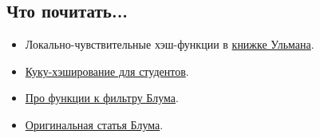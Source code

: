 \subsection{Что почитать...}

\begin{itemize}

\item Локально-чувствительные хэш-функции в \href{http://infolab.stanford.edu/~ullman/mmds/book.pdf}{книжке Ульмана}.
\item \href{http://www.it-c.dk/people/pagh/papers/cuckoo-undergrad.pdf}{Куку-хэширование для студентов}.
\item \href{http://www.eecs.harvard.edu/~kirsch/pubs/bbbf/rsa.pdf}{Про функции к фильтру Блума}.
\item \href{http://trac.astrometry.net/export/23660/trunk/documents/papers/dstn-review/papers/bloom1970.pdf}{Оригинальная статья Блума}.
  
\end{itemize}


\clearpage
